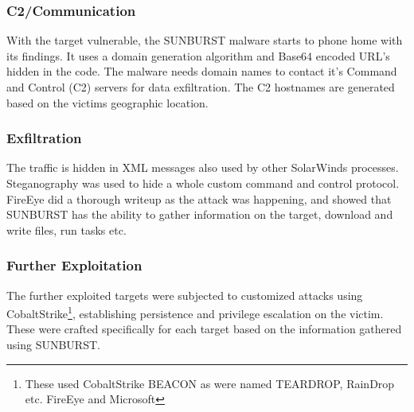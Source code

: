 \documentclass[
	letterpaper, %
	10pt, %
	unnumberedsections, %
	twoside, %
]{LTJournalArticle}
\begin{document}
\subsubsection{C2/Communication}
With the target vulnerable, the SUNBURST malware starts to phone home with its findings. It uses a domain generation algorithm \cite{Mandiant} and Base64 encoded URL's hidden in the code. The malware needs domain names to contact it's Command and Control (C2) servers for data exfiltration. The C2 hostnames are generated based on the victims geographic location. 

\subsubsection{Exfiltration}
The traffic is hidden in XML messages also used by other SolarWinds processes. Steganography was used to hide a whole custom command and control protocol. FireEye did a thorough writeup as the attack was happening\cite{Mandiant}, and showed that SUNBURST has the ability to gather information on the target, download and write files, run tasks etc.    

\subsubsection{Further Exploitation}
The further exploited targets were subjected to customized attacks using CobaltStrike\footnote{These used CobaltStrike BEACON as were named TEARDROP, RainDrop etc. FireEye and Microsoft\cite{MicrosoftSolarwinds}}, establishing persistence and privilege escalation on the victim. These were crafted specifically for each target based on the information gathered using SUNBURST.     
\end{document}

